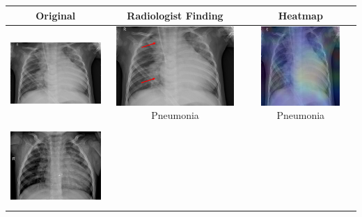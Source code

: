 \begin{longtable} { | c | c | c | }
    \hline
    \textbf{Original} & \textbf{Radiologist Finding} & \textbf{Heatmap} \\ \hline
    \begin{minipage}{.3\textwidth}
    \vspace{1em}
      \includegraphics[width=\linewidth, height=30mm]{Images/PneumoniaOrig1.jpg}
    \vspace{0.5em}
    \end{minipage}
    &
  \begin{minipage}{.3\textwidth}
      \vspace{1em}
      \includegraphics[width=\linewidth, height=30mm]{Images/PneuRadio1.png}
           \centering  Pneumonia
               \vspace{0.5em}
    \end{minipage}
    & 
    \begin{minipage}{.3\textwidth}
        \vspace{1em}
      \includegraphics[width=\linewidth, height=30mm]{Images/PneumoniaHeatmap1.jpg}
      \centering Pneumonia
          \vspace{0.5em}
    \end{minipage}
    \\ \hline
        \begin{minipage}{.3\textwidth}
    \vspace{1em}
      \includegraphics[width=\linewidth, height=30mm]{Images/PneumoniaOrig2.jpg}

\end{minipage}
\end{longtable}
